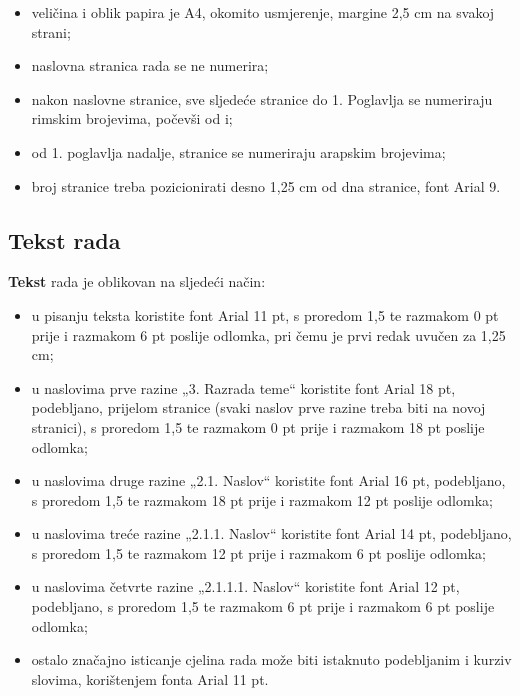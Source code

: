 \documentclass[]{foi}
\begin{document}
\begin{itemize}
	\item veličina i oblik papira je A4, okomito usmjerenje, margine 2,5 cm na svakoj strani;

	\item naslovna stranica rada se ne numerira;

	\item nakon naslovne stranice, sve sljedeće stranice do 1. Poglavlja se numeriraju rimskim brojevima, počevši od i;

	\item od 1. poglavlja nadalje, stranice se numeriraju arapskim brojevima;

	\item broj stranice treba pozicionirati desno 1,25 cm od dna stranice, font Arial 9.
\end{itemize}

\subsection{Tekst rada}

\textbf{Tekst} rada je oblikovan na sljedeći način:
\begin{itemize}
	\item u pisanju teksta koristite font Arial 11 pt, s proredom 1,5 te razmakom 0 pt prije i razmakom 6 pt poslije odlomka, pri čemu je prvi redak uvučen za 1,25 cm;

	\item u naslovima prve razine „3. Razrada teme“ koristite font Arial 18 pt, podebljano, prijelom stranice (svaki naslov prve razine treba biti na novoj stranici), s proredom 1,5 te razmakom 0 pt prije i razmakom 18 pt poslije odlomka;

	\item u naslovima druge razine „2.1. Naslov“ koristite font Arial 16 pt, podebljano, s proredom 1,5 te razmakom 18 pt prije i razmakom 12 pt poslije odlomka;

	\item u naslovima treće razine „2.1.1. Naslov“ koristite font Arial 14 pt, podebljano, s proredom 1,5 te razmakom 12 pt prije i razmakom 6 pt poslije odlomka;

	\item u naslovima četvrte razine „2.1.1.1. Naslov“ koristite font Arial 12 pt, podebljano, s proredom 1,5 te razmakom 6 pt prije i razmakom 6 pt poslije odlomka;

	\item ostalo značajno isticanje cjelina rada može biti istaknuto podebljanim i kurziv slovima, korištenjem fonta Arial 11 pt.
\end{itemize}
\end{document}
